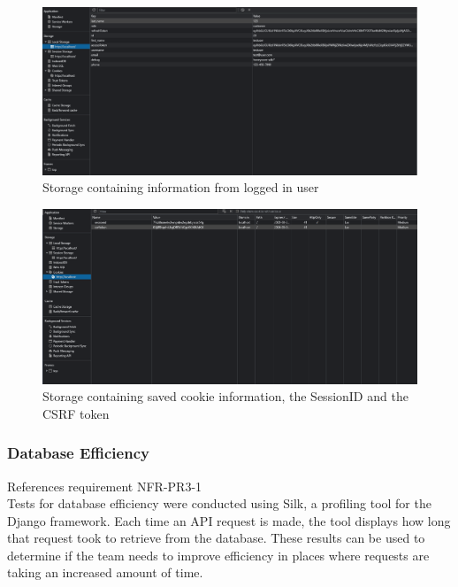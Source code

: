 \documentclass[12pt, titlepage]{article}
\begin{document}
\begin{figure}[H]
    \centering
    \includegraphics[width=\textwidth]{VnVReport/result_images/ssu_storage.png}
    \caption{Storage containing information from logged in user}
    \label{fig:ssu_storage}
\end{figure}

\begin{figure}[H]
    \centering
    \includegraphics[width=\textwidth]{VnVReport/result_images/ssu_cookies.png}
    \caption{Storage containing saved cookie information, the SessionID and the CSRF token}
    \label{fig:ssu_cookies}
\end{figure}

\subsubsection{Database Efficiency}
References requirement NFR-PR3-1\\
\noindent Tests for database efficiency were conducted using Silk, a profiling tool for the Django framework. Each time an API request is made, the tool displays how long that request took to retrieve from the database. These results can be used to determine if the team needs to improve efficiency in places where requests are taking an increased amount of time.\\
\end{document}
